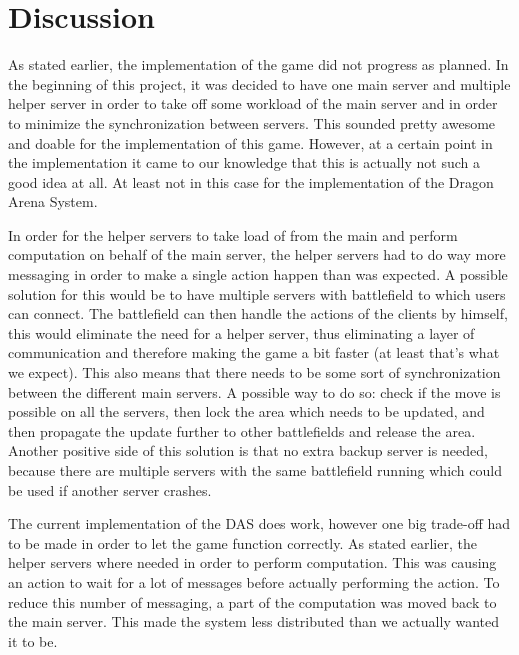 \section{Discussion}
As stated earlier, the implementation of the game did not progress as planned.
In the beginning of this project, it was decided to have one main server and multiple helper server in order to take off some workload of the main server and in order to minimize the synchronization between servers.
This sounded pretty awesome and doable for the implementation of this game.
However, at a certain point in the implementation it came to our knowledge that this is actually not such a good idea at all.
At least not in this case for the implementation of the Dragon Arena System.

In order for the helper servers to take load of from the main and perform computation on behalf of the main server, the helper servers had to do way more messaging in order to make a single action happen than was expected.
A possible solution for this would be to have multiple servers with battlefield to which users can connect.
The battlefield can then handle the actions of the clients by himself, this would eliminate the need for a helper server, thus eliminating a layer of communication and therefore making the game a bit faster (at least that's what we expect). 
This also means that there needs to be some sort of synchronization between the different main servers.
A possible way to do so: check if the move is possible on all the servers, then lock the area which needs to be updated, and then propagate the update further to other battlefields and release the area.
Another positive side of this solution is that no extra backup server is needed, because there are multiple servers with the same battlefield running which could be used if another server crashes.

The current implementation of the DAS does work, however one big trade-off had to be made in order to let the game function correctly.
As stated earlier, the helper servers where needed in order to perform computation. 
This was causing an action to wait for a lot of messages before actually performing the action.
To reduce this number of messaging, a part of the computation was moved back to the main server.
This made the system less distributed than we actually wanted it to be.

